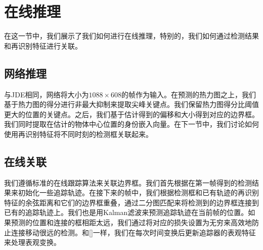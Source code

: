 \documentclass{ctexart}
\begin{document}
\section{在线推理}
在这一节中，我们展示了我们如何进行在线推理，特别的，我们如何通过检测结果和再识别特征进行关联。
\subsection{网络推理}
与JDE相同，网络将大小为$1088\times 608$的帧作为输入。在预测的热力图之上，我们基于热力图的得分进行非最大抑制来提取尖峰关键点。我们保留热力图得分比阈值更大的位置的关键点。之后，我们基于估计得到的偏移和大小得到对应的边界框。我们同时提取在估计的物体中心位置的身份嵌入向量。在下一节中，我们讨论如何使用再识别特征将不同时刻的检测框关联起来。
\subsection{在线关联}
我们遵循标准的在线跟踪算法来关联边界框。我们首先根据在第一帧得到的检测结果来初始化一些追踪轨迹。在接下来的帧中，我们根据检测框和已有轨迹的再识别特征的余弦距离和它们的边界框重叠，通过二分图匹配来将检测到的边界框连接到已有的追踪轨迹上。我们也是用Kalman滤波来预测追踪轨迹在当前帧的位置。如果预测的位置和连接的框相距太远，我们通过将对应的损失设置为无穷来高效地防止连接移动很远的检测。和[]一样，我们在每次时间变换后更新追踪器的表观特征来处理表观变换。
\end{document}
